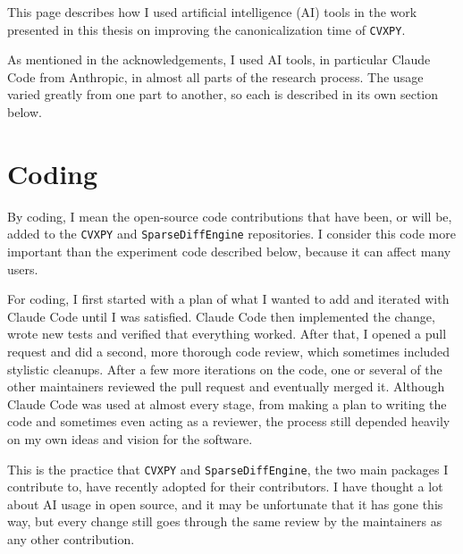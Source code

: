 %
This page describes how I used artificial intelligence (AI) tools in the work presented in this thesis on improving the
canonicalization time of \texttt{CVXPY}.

As mentioned in the acknowledgements, I used AI tools, in particular Claude Code from
Anthropic, in almost all parts of the research process. The usage varied greatly from one part
to another, so each is described in its own section below.

\section*{Coding}

By coding, I mean the open-source code contributions that have been, or will be, added to the
\texttt{CVXPY} and \texttt{SparseDiffEngine} repositories. I consider this code more important
than the experiment code described below, because it can affect many users.

For coding, I first started with a plan of what I wanted to add and iterated with Claude Code
until I was satisfied. Claude Code then implemented the change, wrote new tests and verified
that everything worked. After that, I opened a pull request and did a second, more thorough code
review, which sometimes included stylistic cleanups. After a few more iterations on the code,
one or several of the other maintainers reviewed the pull request and eventually merged it.
Although Claude Code was used at almost every stage, from making a plan to writing the code and
sometimes even acting as a reviewer, the process still depended heavily on my own ideas and
vision for the software.

This is the practice that \texttt{CVXPY} and \texttt{SparseDiffEngine}, the two main packages
I contribute to, have recently adopted for their contributors. I have thought a lot
about AI usage in open source, and it may be unfortunate that it has gone this way, but every
change still goes through the same review by the maintainers as any other contribution.

